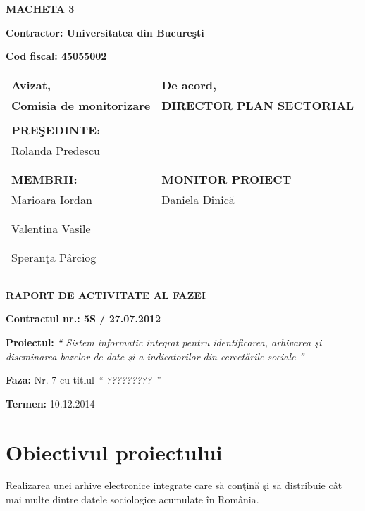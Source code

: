 \documentclass[a4paper, 10pt]{article}
\title{}
\author{}
\date{2013-04-08}
\begin{document}
{\raggedleft\bfseries
MACHETA 3
\par}

{\bfseries
Contractor: Universitatea din Bucure\c{s}ti}

{\textbf{Cod fiscal: 45055002}

\bigskip


\begin{tabular}{@{}l l}
\textbf{Avizat,}&\textbf{De acord,}\\
\textbf{Comisia de monitorizare}&\textbf{DIRECTOR PLAN SECTORIAL}\\
\\
\textbf{PRE\c{S}EDINTE:}&\\
Rolanda Predescu&\\
\\
\\
\textbf{MEMBRII:}&\textbf{MONITOR PROIECT}\\
Marioara Iordan&Daniela Dinic\u{a}\\
\\
\\
Valentina Vasile&\\
\\
\\
Speran\c{t}a P\^{a}rciog\\
\\
\\
\end{tabular}

\bigskip

\bigskip

{\centering\bfseries
RAPORT DE ACTIVITATE AL FAZEI
\par}

\bigskip

{\bfseries
Contractul nr.: 5S / 27.07.2012}

{
\textbf{Proiectul: }
\textit{`` Sistem informatic integrat pentru identificarea, arhivarea \c{s}i diseminarea bazelor de date \c{s}i a indicatorilor din
cercet\u{a}rile sociale ''}}

{
\textbf{Faza: }
Nr. 7 cu titlul 
\textit{`` ????????? ''}}

{\textbf{Termen:} 10.12.2014}

\medskip

\section{Obiectivul proiectului}

Realizarea unei arhive electronice integrate care s\u{a}
con\c{t}in\u{a} \c{s}i s\u{a} distribuie c\^at mai multe dintre 
datele sociologice acumulate \^in Rom\^ania.

}
\end{document}
